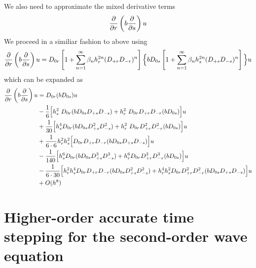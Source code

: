 \documentclass[10pt]{article}
\begin{document}
\newcommand{\Dzr}{D_{0r}}
\newcommand{\Dzs}{D_{0s}}
\newcommand{\Dpr}{D_{+r}}
\newcommand{\Dmr}{D_{-r}}
\newcommand{\Dps}{D_{+s}}
\newcommand{\Dms}{D_{-s}}

We also need to approximate the mixed derivative terms
\[
     {\partial\over\partial r} \left( b {\partial\over\partial s} \right) u
\]
We proceed in a similiar fashion to above using
\[
{\partial\over\partial r} \left( b {\partial\over\partial s} \right) u =
   \Dzr\left[ 1 + \sum_{n=1}^{\infty}  \beta_n h_r^{2n} (\Dpr\Dmr)^n \right]
     \Big\{ b \Dzs\left[ 1 + \sum_{n=1}^{\infty}  \beta_n h_s^{2n} (\Dps\Dms)^n \right]\Big\} u
\]
which can be expanded as
\begin{align*}
{\partial\over\partial r} \left( b {\partial\over\partial s} \right) u &=
    \Dzr( b \Dzs) u \\
    & -{1\over 6} \Big[ h_s^2~\Dzr( b \Dzs\Dps\Dms )  + h_r^2~\Dzr\Dpr\Dmr( b \Dzs) \Big] u \\
    & +{1\over 30} \Big[ h_s^4\Dzr( b \Dzs\Dps^2\Dms^2 )+ h_r^2~\Dzr\Dpr^2\Dmr^2( b \Dzs) \Big] u \\
    & +{1\over 6\cdot 6} h_r^2 h_s^2 \Big[ \Dzr\Dpr\Dmr( b\Dzs\Dps\Dms ) \Big] u  \\
    & -{1\over 140}  \Big[ h_s^6 \Dzr( b \Dzs\Dps^3\Dms^3 ) + h_r^6 \Dzr\Dpr^3\Dmr^3( b \Dzs )  \Big] u  \\
    & -{1\over 6\cdot 30} \Big[  h_r^2 h_s^4 \Dzr\Dpr\Dmr( b \Dzs\Dps^2\Dms^2 )
                                 +h_r^4 h_s^2 \Dzr\Dpr^2\Dmr^2( b \Dzs\Dps\Dms ) \Big] u  \\
    & + O(h^8)
\end{align*}


\section{Higher-order accurate time stepping for the second-order wave equation}
\end{document}
